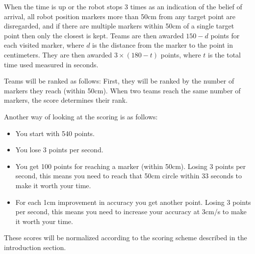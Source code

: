 \documentclass{article}
\begin{document}
When the time is up or the robot stops 3 times as an indication of the belief of arrival, all robot position markers more than 50cm from any target point are disregarded, and if there are multiple markers within 50cm of a single target point then only the closest is kept. Teams are then awarded $150 - d$ points for each visited marker, where $d$ is the distance from the marker to the point in centimeters. They are then awarded $3 \times (180 - t)$ points, where $t$ is the total time used measured in seconds.

Teams will be ranked as follows: First, they will be ranked by the number of markers they reach (within 50cm). When two teams reach the same number of markers, the score determines their rank.

Another way of looking at the scoring is as follows:

\begin{itemize}
 \item You start with 540 points.
 \item You lose 3 points per second.
 \item You get 100 points for reaching a marker (within 50cm). Losing 3 points per second, this means you need to reach that 50cm circle within 33 seconds to make it worth your time.
 \item For each 1cm improvement in accuracy you get another point. Losing 3 points per second, this means you need to increase your accuracy at 3cm/s to make it worth your time. 
\end{itemize}

These scores will be normalized according to the scoring scheme described in the introduction section.
\end{document}
